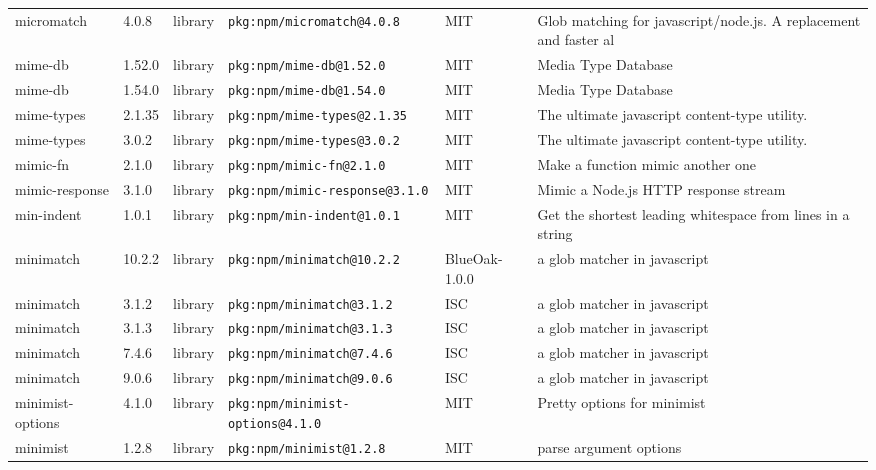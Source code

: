 \documentclass[11pt,a4paper]{article}
\begin{document}
\begin{longtable}{|p{4cm}|p{2cm}|p{1.6cm}|p{5cm}|p{1.5cm}|p{3.5cm}|}
\raggedright micromatch & 4.0.8 & library & \small\texttt{pkg:npm/micromatch@4.0.8} & MIT & \small Glob matching for javascript/node.js. A replacement and faster al \\
\raggedright mime-db & 1.52.0 & library & \small\texttt{pkg:npm/mime-db@1.52.0} & MIT & \small Media Type Database \\
\raggedright mime-db & 1.54.0 & library & \small\texttt{pkg:npm/mime-db@1.54.0} & MIT & \small Media Type Database \\
\raggedright mime-types & 2.1.35 & library & \small\texttt{pkg:npm/mime-types@2.1.35} & MIT & \small The ultimate javascript content-type utility. \\
\raggedright mime-types & 3.0.2 & library & \small\texttt{pkg:npm/mime-types@3.0.2} & MIT & \small The ultimate javascript content-type utility. \\
\raggedright mimic-fn & 2.1.0 & library & \small\texttt{pkg:npm/mimic-fn@2.1.0} & MIT & \small Make a function mimic another one \\
\raggedright mimic-response & 3.1.0 & library & \small\texttt{pkg:npm/mimic-response@3.1.0} & MIT & \small Mimic a Node.js HTTP response stream \\
\raggedright min-indent & 1.0.1 & library & \small\texttt{pkg:npm/min-indent@1.0.1} & MIT & \small Get the shortest leading whitespace from lines in a string \\
\raggedright minimatch & 10.2.2 & library & \small\texttt{pkg:npm/minimatch@10.2.2} & BlueOak-1.0.0 & \small a glob matcher in javascript \\
\raggedright minimatch & 3.1.2 & library & \small\texttt{pkg:npm/minimatch@3.1.2} & ISC & \small a glob matcher in javascript \\
\raggedright minimatch & 3.1.3 & library & \small\texttt{pkg:npm/minimatch@3.1.3} & ISC & \small a glob matcher in javascript \\
\raggedright minimatch & 7.4.6 & library & \small\texttt{pkg:npm/minimatch@7.4.6} & ISC & \small a glob matcher in javascript \\
\raggedright minimatch & 9.0.6 & library & \small\texttt{pkg:npm/minimatch@9.0.6} & ISC & \small a glob matcher in javascript \\
\raggedright minimist-options & 4.1.0 & library & \small\texttt{pkg:npm/minimist-options@4.1.0} & MIT & \small Pretty options for minimist \\
\raggedright minimist & 1.2.8 & library & \small\texttt{pkg:npm/minimist@1.2.8} & MIT & \small parse argument options \\

\end{longtable}
\end{document}
